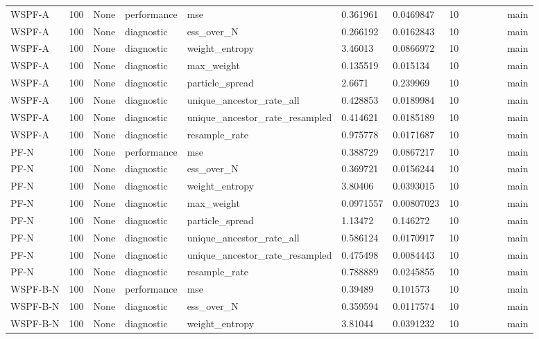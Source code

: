 \begin{tabular}{lllllllllllll}
WSPF-A & 100 & None & performance & mse & 0.361961 & 0.0469847 & 10 &  &  &  &  & main \\
WSPF-A & 100 & None & diagnostic & ess\_over\_N & 0.266192 & 0.0162843 & 10 &  &  &  &  & main \\
WSPF-A & 100 & None & diagnostic & weight\_entropy & 3.46013 & 0.0866972 & 10 &  &  &  &  & main \\
WSPF-A & 100 & None & diagnostic & max\_weight & 0.135519 & 0.015134 & 10 &  &  &  &  & main \\
WSPF-A & 100 & None & diagnostic & particle\_spread & 2.6671 & 0.239969 & 10 &  &  &  &  & main \\
WSPF-A & 100 & None & diagnostic & unique\_ancestor\_rate\_all & 0.428853 & 0.0189984 & 10 &  &  &  &  & main \\
WSPF-A & 100 & None & diagnostic & unique\_ancestor\_rate\_resampled & 0.414621 & 0.0185189 & 10 &  &  &  &  & main \\
WSPF-A & 100 & None & diagnostic & resample\_rate & 0.975778 & 0.0171687 & 10 &  &  &  &  & main \\
PF-N & 100 & None & performance & mse & 0.388729 & 0.0867217 & 10 &  &  &  &  & main \\
PF-N & 100 & None & diagnostic & ess\_over\_N & 0.369721 & 0.0156244 & 10 &  &  &  &  & main \\
PF-N & 100 & None & diagnostic & weight\_entropy & 3.80406 & 0.0393015 & 10 &  &  &  &  & main \\
PF-N & 100 & None & diagnostic & max\_weight & 0.0971557 & 0.00807023 & 10 &  &  &  &  & main \\
PF-N & 100 & None & diagnostic & particle\_spread & 1.13472 & 0.146272 & 10 &  &  &  &  & main \\
PF-N & 100 & None & diagnostic & unique\_ancestor\_rate\_all & 0.586124 & 0.0170917 & 10 &  &  &  &  & main \\
PF-N & 100 & None & diagnostic & unique\_ancestor\_rate\_resampled & 0.475498 & 0.0084443 & 10 &  &  &  &  & main \\
PF-N & 100 & None & diagnostic & resample\_rate & 0.788889 & 0.0245855 & 10 &  &  &  &  & main \\
WSPF-B-N & 100 & None & performance & mse & 0.39489 & 0.101573 & 10 &  &  &  &  & main \\
WSPF-B-N & 100 & None & diagnostic & ess\_over\_N & 0.359594 & 0.0117574 & 10 &  &  &  &  & main \\
WSPF-B-N & 100 & None & diagnostic & weight\_entropy & 3.81044 & 0.0391232 & 10 &  &  &  &  & main \\

\end{tabular}

